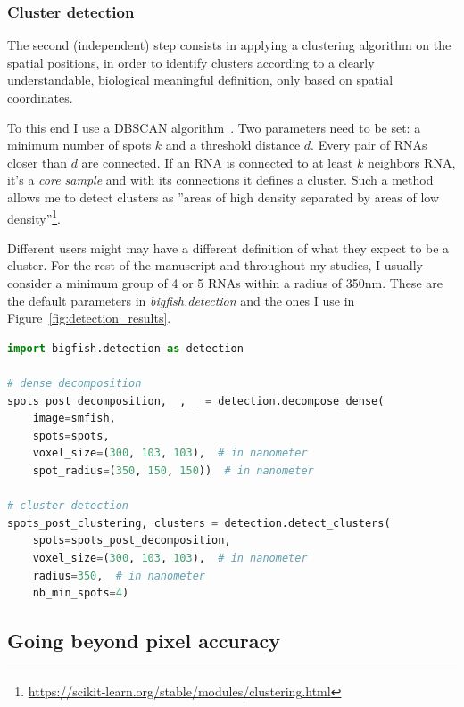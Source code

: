 \subsubsection{Cluster detection}

The second (independent) step consists in applying a clustering algorithm on the spatial positions, in order to identify clusters according to a clearly understandable, biological meaningful definition, only based on spatial coordinates.

To this end I use a DBSCAN algorithm~\cite{ester_density-based_1996, scikit-learn}.
Two parameters need to be set: a minimum number of spots $k$ and a threshold distance $d$.
Every pair of \ac{RNA}s closer than $d$ are connected.
If an \ac{RNA} is connected to at least $k$ neighbors \ac{RNA}, it's a \emph{core sample} and with its connections it defines a cluster.
Such a method allows me to detect clusters as ''areas of high density separated by areas of low density''\footnote{\url{https://scikit-learn.org/stable/modules/clustering.html}}.

Different users might may have a different definition of what they expect to be a cluster.
For the rest of the manuscript and throughout my studies, I usually consider a minimum group of 4 or 5 \ac{RNA}s within a radius of 350nm.
These are the default parameters in \emph{bigfish.detection} and the ones I use in Figure~\ref{fig:detection_results}.\\

\begin{minipage}{0.9\textwidth}
\begin{lstlisting}[language=Python]
import bigfish.detection as detection

# dense decomposition
spots_post_decomposition, _, _ = detection.decompose_dense(
    image=smfish,
    spots=spots,
    voxel_size=(300, 103, 103),  # in nanometer
    spot_radius=(350, 150, 150))  # in nanometer

# cluster detection
spots_post_clustering, clusters = detection.detect_clusters(
    spots=spots_post_decomposition,
    voxel_size=(300, 103, 103),  # in nanometer
    radius=350,  # in nanometer
    nb_min_spots=4)
\end{lstlisting}
\end{minipage}

\subsection{Going beyond pixel accuracy}
\label{subsec:subpixel}

